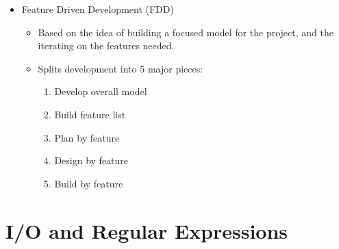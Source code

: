 \documentclass[11pt]{article}
\begin{document}
\begin{itemize}
		\item Feature Driven Development (FDD)
			\begin{itemize}
				\item Based on the idea of building a focused model for the project, and the iterating on the features needed.
				\item Splits development into 5 major pieces:
					\begin{enumerate}
						\item Develop overall model
						\item Build feature list
						\item Plan by feature
						\item Design by feature
						\item Build by feature
					\end{enumerate}
			\end{itemize}

	\end{itemize}

\newpage

\section{I/O and Regular Expressions}
\end{document}
